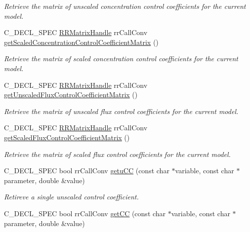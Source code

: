 \begin{DoxyCompactItemize}
\begin{DoxyCompactList}\small\item\em \-Retrieve the matrix of unscaled concentration control coefficients for the current model. \end{DoxyCompactList}\item 
\-C\-\_\-\-D\-E\-C\-L\-\_\-\-S\-P\-E\-C \hyperlink{rr__c__types_8h_a87174eefa58ae98dec58c9253ae6c5da}{\-R\-R\-Matrix\-Handle} \*
rr\-Call\-Conv \hyperlink{group__utility_gad28644ca7615c71725056028a0a048ba}{get\-Scaled\-Concentration\-Control\-Coefficient\-Matrix} ()
\begin{DoxyCompactList}\small\item\em \-Retrieve the matrix of scaled concentration control coefficients for the current model. \end{DoxyCompactList}\item 
\-C\-\_\-\-D\-E\-C\-L\-\_\-\-S\-P\-E\-C \hyperlink{rr__c__types_8h_a87174eefa58ae98dec58c9253ae6c5da}{\-R\-R\-Matrix\-Handle} \*
rr\-Call\-Conv \hyperlink{group__utility_ga4b464166bb67773916067bc7e190a338}{get\-Unscaled\-Flux\-Control\-Coefficient\-Matrix} ()
\begin{DoxyCompactList}\small\item\em \-Retrieve the matrix of unscaled flux control coefficients for the current model. \end{DoxyCompactList}\item 
\-C\-\_\-\-D\-E\-C\-L\-\_\-\-S\-P\-E\-C \hyperlink{rr__c__types_8h_a87174eefa58ae98dec58c9253ae6c5da}{\-R\-R\-Matrix\-Handle} \*
rr\-Call\-Conv \hyperlink{group__utility_gad63647a85b299d463b1e4cd5671d0881}{get\-Scaled\-Flux\-Control\-Coefficient\-Matrix} ()
\begin{DoxyCompactList}\small\item\em \-Retrieve the matrix of scaled flux control coefficients for the current model. \end{DoxyCompactList}\item 
\-C\-\_\-\-D\-E\-C\-L\-\_\-\-S\-P\-E\-C bool rr\-Call\-Conv \hyperlink{group__utility_ga6655b7aebdc9e6fad4e7a54e3de9195d}{getu\-C\-C} (const char $\ast$variable, const char $\ast$parameter, double \&value)
\begin{DoxyCompactList}\small\item\em \-Retireve a single unscaled control coefficient. \end{DoxyCompactList}\item 
\-C\-\_\-\-D\-E\-C\-L\-\_\-\-S\-P\-E\-C bool rr\-Call\-Conv \hyperlink{group__utility_ga49c703842a069c37fa472f2740dd514b}{get\-C\-C} (const char $\ast$variable, const char $\ast$parameter, double \&value)

\end{DoxyCompactItemize}

